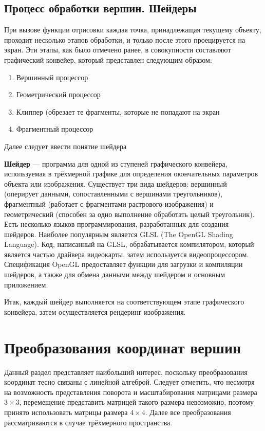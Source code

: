 \subsection{Процесс обработки вершин. Шейдеры}
При вызове функции отрисовки каждая точка, принадлежащая текущему объекту, проходит несколько этапов обработки, 
и только после этого проецируется на экран. Эти этапы, как было отмечено ранее, в совокупности составляют 
графический конвейер, который представлен следующим образом:
\begin{enumerate}
\item Вершинный процессор
\item Геометрический процессор
\item Клиппер (обрезает те фрагменты, которые не попадают на экран
\item Фрагментный процессор
\end{enumerate}


Далее следует ввести понятие шейдера

\textbf{Шейдер} --- программа для одной из ступеней графического конвейера, используемая в трёхмерной графике 
для определения окончательных параметров объекта или изображения.
Существует три вида шейдеров: вершинный (оперирует данными, сопоставленными с вершинами треугольников), 
фрагментный (работает с фрагментами растрового изображения) и геометрический (способен за одно выполнение 
обработать целый треугольник). Есть несколько языков программирования, разработанных для создания шейдеров. 
Наиболее популярным является GLSL (The OpenGL Shading Language)\cite{wiki:glsl}. Код, написанный на GLSL, обрабатывается компилятором, 
который является частью драйвера видеокарты, затем используется видеопроцессором. Спецификация OpenGL предоставляет 
функции для загрузки и компиляции шейдеров, а также для обмена данными между шейдером и основным приложением.

Итак, каждый шейдер выполняется на соответствующем этапе графического конвейера, затем осуществляется рендеринг изображения.

\section{Преобразования координат вершин}
Данный раздел представляет наибольший интерес, поскольку преобразования координат тесно связаны с линейной алгеброй. 
Следует отметить, что несмотря на возможность представления поворота и масштабирования матрицами размера \begin{math}3\times3\end{math}, 
перемещение представить матрицей такого размера невозможно, поэтому принято использовать матрицы размера \begin{math}4\times4\end{math}. 
Далее все преобразования рассматриваются в случае трёхмерного пространства.
